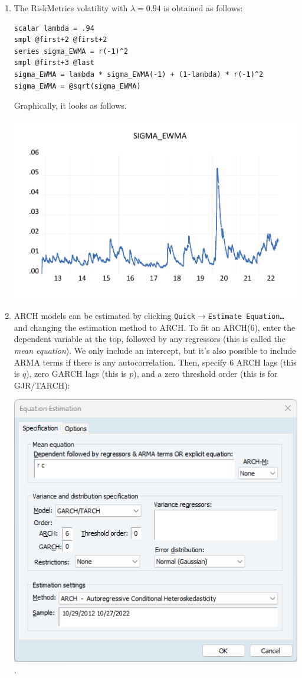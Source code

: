 \documentclass[11pt, a4paper]{article}
\begin{document}
\begin{enumerate}
\begin{enumerate}
\item The RiskMetrics volatility with $\lambda=0.94$ is obtained as follows:
\begin{verbatim}
scalar lambda = .94
smpl @first+2 @first+2
series sigma_EWMA = r(-1)^2
smpl @first+3 @last
sigma_EWMA = lambda * sigma_EWMA(-1) + (1-lambda) * r(-1)^2
sigma_EWMA = @sqrt(sigma_EWMA)
\end{verbatim}
Graphically, it looks as follows.
\begin{center}
\includegraphics[width=.9\textwidth]{ewma94}
\end{center}
\item ARCH models can be estimated by clicking \texttt{Quick$\rightarrow$Estimate Equation\ldots} and changing the estimation method to ARCH. To fit an ARCH(6), enter the dependent variable at the top, followed by any regressors (this is called the \emph{mean equation}). We only include an intercept, but it's also possible to include ARMA terms if there is any autocorrelation. Then, specify 6 ARCH lags (this is $q$), zero GARCH lags (this is $p$), and a zero threshold order (this is for GJR/TARCH):
\begin{center}
\includegraphics[width=.6\textwidth]{quick}.

\end{center}
\end{enumerate}
\end{enumerate}
\end{document}
